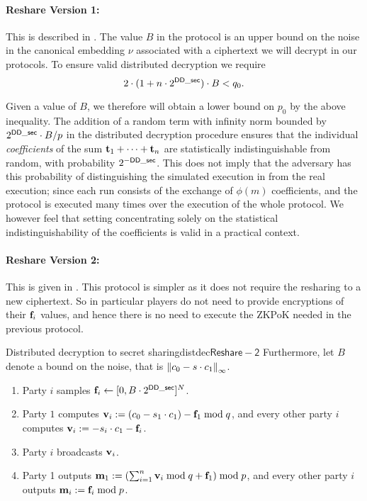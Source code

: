 \paragraph{Reshare Version 1:}
This is described in .
The value $B$ in the protocol is an upper bound on the noise in the canonical embedding
$\nu$ associated with a ciphertext we will decrypt in our protocols.
To ensure valid distributed decryption we require
\[ 2 \cdot (1+n \cdot 2^{\mathsf{DD\_sec}}) \cdot B < q_{0}. \]

Given a value of $B$, we therefore will obtain a lower bound
on $p_0$ by the above inequality.
The addition of a random term with infinity norm bounded by
$2^{\mathsf{DD\_sec}} \cdot B/p$ in the distributed decryption procedure
ensures that the individual {\em coefficients} of the sum
$\mathbf{t}_1+\cdots+\mathbf{t}_n$ are statistically indistinguishable from
random, with probability $2^{-\mathsf{DD\_sec}}$.
This does not imply that the adversary has this probability of
distinguishing the simulated execution in \cite{SPDZ} from the
real execution; since each run consists of the exchange of 
$\phi(m)$ coefficients, and the protocol is executed many times
over the execution of the whole protocol.
We however feel that setting concentrating solely on the
statistical indistinguishability of the coefficients is valid 
in a practical context.

\paragraph{Reshare Version 2:}
This is given in .
This protocol is simpler as it does not require the resharing to a 
new ciphertext.
So in particular players do not need to provide encryptions of
their $\mathbf{f}_i$ values, and hence there is no need
to execute the ZKPoK needed in the previous protocol.

\begin{Boxfig}{Distributed decryption to secret
    sharing}{distdec}{$\mathsf{Reshare-2}$}
Furthermore, let $B$ denote a bound on the noise, that is ${\Vert c_0 - s \cdot c_1 \Vert}_\infty$.
\begin{enumerate}
\item Party $i$ samples $\mathbf{f}_i \leftarrow [0,B\cdot 2^{\mathsf{DD\_sec}}]^N$.
\item Party $1$ computes
  $\mathbf{v}_i := (c_0 - s_1 \cdot c_1) - \mathbf{f}_1 \bmod q$, and every other
  party $i$ computes $\mathbf{v}_i :=  -s_i \cdot c_1- \mathbf{f}_i$.
\item Party $i$ broadcasts $\mathbf{v}_i$.
\item Party 1 outputs
  $\mathbf{m}_1 := (\sum_{i=1}^n \mathbf{v}_i \bmod q + \mathbf{f}_1) \bmod p$, and
  every other party $i$ outputs $\mathbf{m}_i := \mathbf{f}_i \bmod p$.
\end{enumerate}
\end{Boxfig}





